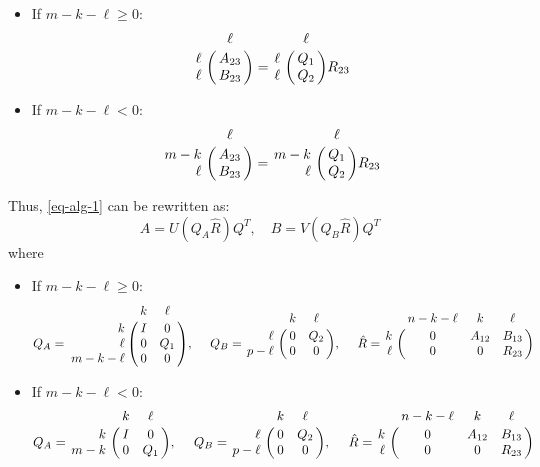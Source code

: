 \paragraph{} 
\begin{itemize}
    	\item If $m-k-\ell \geq 0$:
	    	\[
                \bordermatrix{ & \ell  \cr
                    \hfill \ell & A_{23}  \cr
                    \hfill \ell & B_{23} \cr} = 
                \bordermatrix{ & \ell  \cr
                    \hfill \ell & Q_{1}  \cr
                    \hfill \ell & Q_{2} \cr}R_{23}   
        	\]
    	\item If $m-k-\ell < 0$:  
			\[
                \bordermatrix{ & \ell  \cr
                    \hfill m-k & A_{23}  \cr
                    \hfill \ell & B_{23} \cr} = 
                \bordermatrix{ & \ell  \cr
                    \hfill m-k & Q_{1}  \cr
                    \hfill \ell & Q_{2} \cr}R_{23}   
        	\]          
\end{itemize}
Thus, \eqref {eq-alg-1} can be rewritten as:
\begin{equation} \label{eq-alg-2}
A = U(Q_{A}\hat{R})Q^{T}, \quad 
B = V(Q_{B}\hat{R})Q^{T}
\end{equation}
where 
\begin{itemize}
            	\item If $m-k-\ell \geq 0$:
					\[
                        Q_{A} = \bordermatrix{ & k & \ell \cr
                        \hfill k & I & 0 \cr
                        \hfill \ell & 0 & Q_1 \cr
                        \hfill m-k-\ell & 0 & 0}, \  \ \ \
                        Q_{B} = \bordermatrix{ & k & \ell   \cr
                        \hfill \ell & 0 & Q_2\cr
                        \hfill p-\ell & 0 & 0}, \ \ \ \
                        \hat{R} = \bordermatrix{ & n-k-\ell & k & \ell \cr
                        \hfill k & 0 & A_{12} & B_{13} \cr
                        \hfill \ell & 0 & 0 & R_{23}}
            		\]
				\item If $m-k-\ell < 0$:  
					\[
                        Q_{A} = \bordermatrix{ & k & \ell \cr
                        \hfill k & I & 0 \cr
                        \hfill m-k & 0 & Q_1}, \  \ \ \
                        Q_{B} = \bordermatrix{ & k & \ell   \cr
                        \hfill \ell & 0 & Q_2\cr
                        \hfill p-\ell & 0 & 0}, \ \ \ \
                        \hat{R} = \bordermatrix{ & n-k-\ell & k & \ell \cr
                        \hfill k & 0 & A_{12} & B_{13} \cr
                        \hfill \ell & 0 & 0 & R_{23}}
            		\]
            \end{itemize}
        
